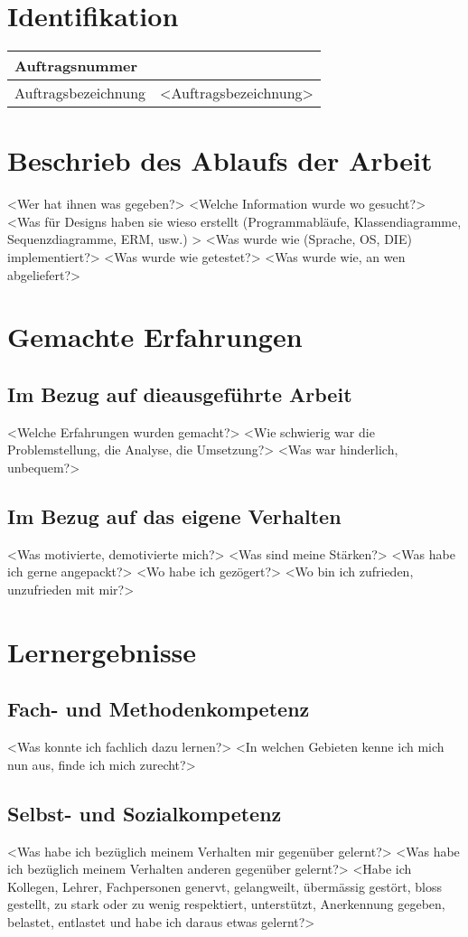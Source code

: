 \section{Identifikation}
\begin{xltabular}{\linewidth}{|l|l|}
	\hline
	Auftragsnummer & 
	\\\hline
	Auftragsbezeichnung & <Auftragsbezeichnung>
	\\\hline
\end{xltabular}
\label{tab:IdentifikationTable}

\section{Beschrieb des Ablaufs der Arbeit}
<Wer hat ihnen was gegeben?>
<Welche Information wurde wo gesucht?>
<Was für Designs haben sie wieso erstellt
(Programmabläufe, Klassendiagramme, Sequenzdiagramme, ERM, usw.) >
<Was wurde wie (Sprache, OS, DIE) implementiert?>
<Was wurde wie getestet?>
<Was wurde wie, an wen abgeliefert?>

\section{Gemachte Erfahrungen}
\subsection{Im Bezug auf dieausgeführte Arbeit}
<Welche Erfahrungen wurden gemacht?>
<Wie schwierig war die Problemstellung, die Analyse, die Umsetzung?>
<Was war hinderlich, unbequem?>
\subsection{Im Bezug auf das eigene Verhalten}
<Was motivierte, demotivierte mich?>
<Was sind meine Stärken?>
<Was habe ich gerne angepackt?>
<Wo habe ich gezögert?>
<Wo bin ich zufrieden, unzufrieden mit mir?>

\section{Lernergebnisse}
\subsection{Fach- und Methodenkompetenz}
<Was konnte ich fachlich dazu lernen?>
<In welchen Gebieten kenne ich mich nun aus, finde ich mich zurecht?>
\subsection{Selbst- und Sozialkompetenz}
<Was habe ich bezüglich meinem Verhalten mir gegenüber gelernt?>
<Was habe ich bezüglich meinem Verhalten anderen gegenüber gelernt?>
<Habe ich Kollegen, Lehrer, Fachpersonen genervt, gelangweilt, übermässig gestört, bloss gestellt, zu stark oder zu wenig respektiert, unterstützt, Anerkennung gegeben, belastet, entlastet und habe ich daraus etwas gelernt?>


